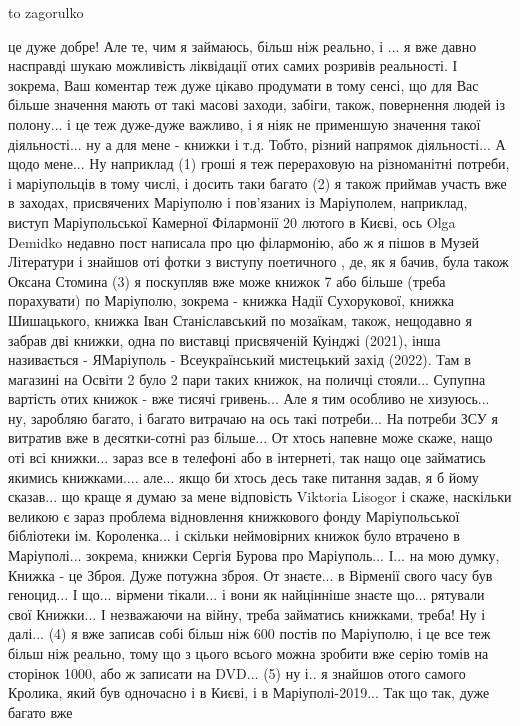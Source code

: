 to zagorulko

це дуже добре! Але те, чим я займаюсь, більш ніж реально, і ... я вже давно
насправді шукаю можливість ліквідації отих самих розривів реальності. І
зокрема, Ваш коментар теж дуже цікаво продумати в тому сенсі, що для Вас більше
значення мають от такі масові заходи, забіги, також, повернення людей із
полону... і це теж дуже-дуже важливо, і я ніяк не применшую значення такої
діяльності...  ну а для мене - книжки і т.д.  Тобто, різний напрямок
діяльності... А щодо мене... Ну наприклад (1) гроші я теж перераховую на
різноманітні потреби, і маріупольців в тому числі, і досить таки багато (2) я
також приймав участь вже в заходах, присвячених Маріуполю і пов'язаних із
Маріуполем, наприклад, виступ Маріупольської Камерної Філармонії 20 лютого в
Києві, ось Olga Demidko недавно пост написала про цю філармонію, або ж я пішов
в Музей Літератури і знайшов оті фотки з виступу поетичного , де, як я бачив,
була також Оксана Стомина (3) я поскупляв вже може книжок 7 або більше (треба
порахувати) по Маріуполю, зокрема - книжка Надії Сухорукової, книжка
Шишацького, книжка Іван Станіславський по мозаїкам, також, нещодавно я забрав
дві книжки, одна по виставці присвяченій Куінджі (2021), інша називається -
ЯМаріуполь - Всеукраїнський мистецький захід (2022). Там в магазині на Освіти 2
було 2 пари таких книжок, на поличці стояли... Супупна вартість отих книжок -
вже тисячі гривень... Але я тим особливо не хизуюсь... ну, заробляю багато, і
багато витрачаю на ось такі потреби... На потреби ЗСУ я витратив вже в
десятки-сотні раз більше... От хтось напевне може скаже, нащо оті всі книжки...
зараз все в телефоні або в інтернеті, так нащо  оце займатись якимись
книжками.... але... якщо би хтось десь таке питання задав, я б йому сказав...
що краще я думаю за мене відповість Viktoria  Lisogor і скаже, наскільки
великою є зараз проблема відновлення книжкового фонду Маріупольської бібліотеки
ім. Короленка... і скільки неймовірних книжок було втрачено в Маріуполі...
зокрема, книжки Сергія Бурова про Маріуполь... І... на мою думку, Книжка - це
Зброя. Дуже потужна зброя. От знаєте... в Вірменії свого часу був геноцид... І
що... вірмени тікали... і вони як найцінніше знаєте що... рятували свої
Книжки... І незважаючи на війну, треба займатись книжками, треба! Ну і далі...
(4) я вже записав собі більш ніж 600 постів по Маріуполю, і це все теж більш
ніж реально, тому що з цього всього можна зробити вже серію томів на сторінок
1000, або ж записати на DVD... (5) ну і.. я знайшов отого самого Кролика, який
був одночасно і в Києві, і в Маріуполі-2019... Так що так, дуже багато вже
